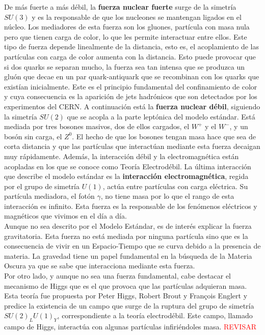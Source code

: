De más fuerte a más débil, la \textbf{fuerza nuclear fuerte} surge de la simetría $SU(3)$ y es la responsable de que los nucleones se mantengan ligados en el núcleo. Los mediadores de esta fuerza son los gluones, partícula con masa nula pero que tienen carga de color, lo que les permite interactuar entre ellos. Este tipo de fuerza depende linealmente de la distancia, esto es, el acoplamiento de las partículas con carga de color aumenta con la distancia. Esto puede provocar que si dos quarks se separan mucho, la fuerza sea tan intensa que se produzca un gluón que decae en un par quark-antiquark que se recombinan con los quarks que existían inicialmente. Este es el principio fundamental del confinamiento de color y cuya consecuencia es la aparición de jets hadrónicos que son detectados por los experimentos del CERN. A continuación está la \textbf{fuerza nuclear débil}, siguiendo la simetría $SU(2)$ que se acopla a la parte leptónica del modelo estándar. Está mediada por tres bosones masivos, dos de ellos cargados, el $W^+$ y el $W^-$, y un bosón sin carga, el $Z^0$. El hecho de que los bosones tengan masa hace que sea de corta distancia y que las partículas que interactúan mediante esta fuerza decaigan muy rápidamente. Además, la interacción débil y la electromagnética están acopladas en los que se conoce como Teoría Electrodébil. La última interacción que describe el modelo estándar es la \textbf{interacción electromagnética}, regida por el grupo de simetría $U(1)$, actúa entre partículas con carga eléctrica. Su partícula mediadora, el fotón $\gamma$, no tiene masa por lo que el rango de esta interacción es infinito. Esta fuerza es la responsable de los fenómenos eléctricos y magnéticos que vivimos en el día a día. \\

Aunque no sea descrito por el Modelo Estándar, es de interés explicar la fuerza gravitatoria. Esta fuerza no está mediada por ninguna partícula sino que es la consecuencia de vivir en un Espacio-Tiempo que se curva debido a la presencia de materia. La gravedad tiene un papel fundamental en la búsqueda de la Materia Oscura ya que se sabe que interacciona mediante esta fuerza.\\

Por otro lado, y aunque no sea una fuerza fundamental, cabe destacar el mecanismo de Higgs que es el que provoca que las partículas adquieran masa. Esta teoría fue propuesta por Peter Higgs, Robert Brout y François Englert y predice la existencia de un campo que surge de la ruptura del grupo de simetría $SU(2)_LU(1)_Y$, correspondiente a la teoría electrodébil. Este campo, llamado campo de Higgs, interactúa con algunas partículas infiriéndoles masa. \textcolor{red}{REVISAR}

